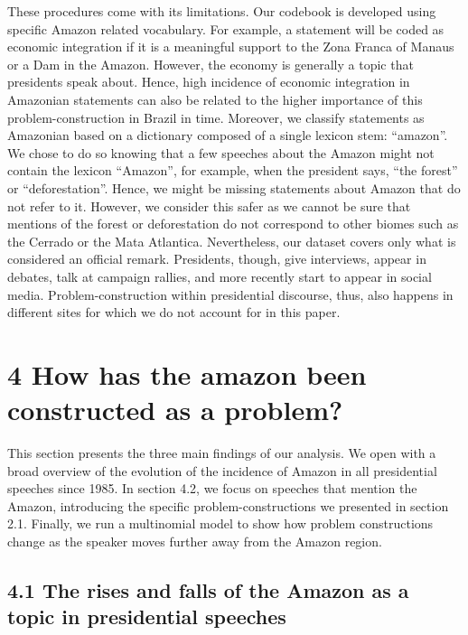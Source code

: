 \documentclass[]{interact}
\theoremstyle{plain}%
\theoremstyle{definition}
\theoremstyle{remark}
\begin{document}
These procedures come with its limitations. Our codebook is developed
using specific Amazon related vocabulary. For example, a statement will
be coded as economic integration if it is a meaningful support to the
Zona Franca of Manaus or a Dam in the Amazon. However, the economy is
generally a topic that presidents speak about. Hence, high incidence of
economic integration in Amazonian statements can also be related to the
higher importance of this problem-construction in Brazil in time.
Moreover, we classify statements as Amazonian based on a dictionary
composed of a single lexicon stem: ``amazon''. We chose to do so knowing
that a few speeches about the Amazon might not contain the lexicon
``Amazon'', for example, when the president says, ``the forest'' or
``deforestation''. Hence, we might be missing statements about Amazon
that do not refer to it. However, we consider this safer as we cannot be
sure that mentions of the forest or deforestation do not correspond to
other biomes such as the Cerrado or the Mata Atlantica. Nevertheless,
our dataset covers only what is considered an official remark.
Presidents, though, give interviews, appear in debates, talk at campaign
rallies, and more recently start to appear in social media.
Problem-construction within presidential discourse, thus, also happens
in different sites for which we do not account for in this paper.

\hypertarget{how-has-the-amazon-been-constructed-as-a-problem}{%
\section{4 How has the amazon been constructed as a
problem?}\label{how-has-the-amazon-been-constructed-as-a-problem}}

This section presents the three main findings of our analysis. We open
with a broad overview of the evolution of the incidence of Amazon in all
presidential speeches since 1985. In section 4.2, we focus on speeches
that mention the Amazon, introducing the specific problem-constructions
we presented in section 2.1. Finally, we run a multinomial model to show
how problem constructions change as the speaker moves further away from
the Amazon region.

\hypertarget{the-rises-and-falls-of-the-amazon-as-a-topic-in-presidential-speeches}{%
\subsection{4.1 The rises and falls of the Amazon as a topic in
presidential
speeches}\label{the-rises-and-falls-of-the-amazon-as-a-topic-in-presidential-speeches}}
\end{document}
